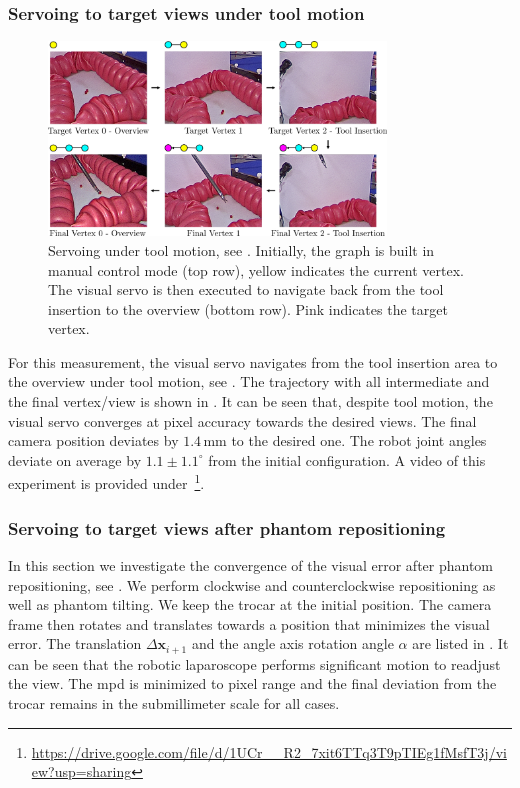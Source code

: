 \subsubsection{Servoing to target views under tool motion}
\label{c2:sec:clin_res_tool}
\begin{figure}[tb]
    \centering
    \includegraphics[width=0.8\textwidth]{img/tool_insertion_trajectory.pdf}
    \caption{Servoing under tool motion, see . Initially, the graph is built in manual control mode (top row), yellow indicates the current vertex. The visual servo is then executed to navigate back from the tool insertion to the overview (bottom row). Pink indicates the target vertex.}
    \label{c2:fig:tool_insertion_trajectory}
\end{figure}
For this measurement, the visual servo navigates from the tool insertion area to the overview under tool motion, see . The trajectory with all intermediate and the final vertex/view is shown in . It can be seen that, despite tool motion, the visual servo converges at pixel accuracy towards the desired views. The final camera position deviates by $1.4\,\text{mm}$ to the desired one. The robot joint angles deviate on average by $1.1\pm1.1^\circ$ from the initial configuration. A video of this experiment is provided under\ \footnote{\label{foot:vid}\url{https://drive.google.com/file/d/1UCr__R2_7xit6TTq3T9pTIEg1fMsfT3j/view?usp=sharing}}.

\subsubsection{Servoing to target views after phantom repositioning}
\label{c2:sec:clin_res_re}
In this section we investigate the convergence of the visual error after phantom repositioning, see . We perform clockwise and counterclockwise repositioning as well as phantom tilting. We keep the trocar at the initial position. The camera frame then rotates and translates towards a position that minimizes the visual error. The translation $\Delta\mathbf{x}_{i+1}$ and the angle axis rotation angle $\alpha$ are listed in . It can be seen that the robotic laparoscope performs significant motion to readjust the view. The \gls{mpd} is minimized to pixel range and the final deviation from the trocar remains in the submillimeter scale for all cases. 

